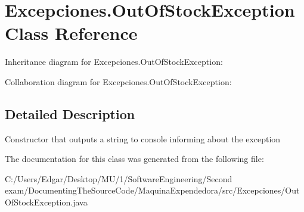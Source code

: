 \hypertarget{class_excepciones_1_1_out_of_stock_exception}{}\section{Excepciones.\+Out\+Of\+Stock\+Exception Class Reference}
\label{class_excepciones_1_1_out_of_stock_exception}


Inheritance diagram for Excepciones.\+Out\+Of\+Stock\+Exception\+:


Collaboration diagram for Excepciones.\+Out\+Of\+Stock\+Exception\+:


\subsection{Detailed Description}
Constructor that outputs a string to console informing about the exception 

The documentation for this class was generated from the following file\+:\begin{DoxyCompactItemize}
\item 
C\+:/\+Users/\+Edgar/\+Desktop/\+M\+U/1/\+Software\+Engineering/\+Second exam/\+Documenting\+The\+Source\+Code/\+Maquina\+Expendedora/src/\+Excepciones/Out\+Of\+Stock\+Exception.\+java\end{DoxyCompactItemize}
